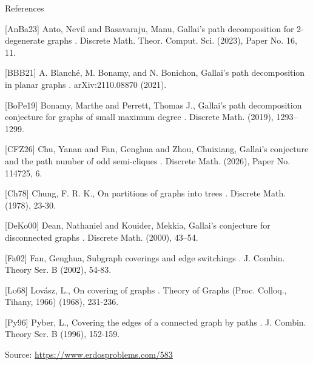 \documentclass{article}
\begin{document}
References

[AnBa23] Anto, Nevil and Basavaraju, Manu, Gallai's path decomposition for 2-degenerate graphs . Discrete Math. Theor. Comput. Sci. (2023), Paper No. 16, 11.

[BBB21] A. Blanch\'{e}, M. Bonamy, and N. Bonichon, Gallai's path decomposition in planar graphs . arXiv:2110.08870 (2021).

[BoPe19] Bonamy, Marthe and Perrett, Thomas J., Gallai's path decomposition conjecture for graphs of small maximum degree . Discrete Math. (2019), 1293--1299.

[CFZ26] Chu, Yanan and Fan, Genghua and Zhou, Chuixiang, Gallai's conjecture and the path number of odd semi-cliques . Discrete Math. (2026), Paper No. 114725, 6.

[Ch78] Chung, F. R. K., On partitions of graphs into trees . Discrete Math. (1978), 23-30.

[DeKo00] Dean, Nathaniel and Kouider, Mekkia, Gallai's conjecture for disconnected graphs . Discrete Math. (2000), 43--54.

[Fa02] Fan, Genghua, Subgraph coverings and edge switchings . J. Combin. Theory Ser. B (2002), 54-83.

[Lo68] Lov\'{a}sz, L., On covering of graphs . Theory of Graphs (Proc. Colloq., Tihany, 1966) (1968), 231-236.

[Py96] Pyber, L., Covering the edges of a connected graph by paths . J. Combin. Theory Ser. B (1996), 152-159.

\bigskip
\noindent\small{Source: \url{https://www.erdosproblems.com/583}}
\end{document}
